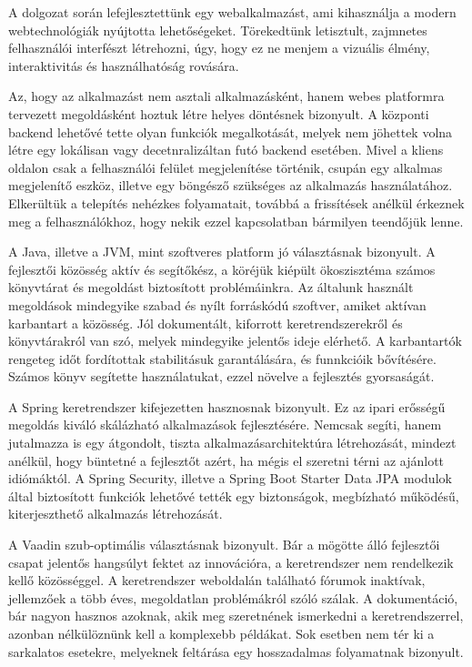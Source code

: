 A dolgozat során lefejlesztettünk egy webalkalmazást, ami kihasználja a modern webtechnológiák nyújtotta lehetőségeket. Törekedtünk letisztult, zajmnetes felhasználói interfészt létrehozni, úgy, hogy ez ne menjem a vizuális élmény, interaktivitás és használhatóság rovására. \par

Az, hogy az alkalmazást nem asztali alkalmazásként, hanem webes platformra tervezett megoldásként hoztuk létre helyes döntésnek bizonyult. A központi backend lehetővé tette olyan funkciók megalkotását, melyek nem jöhettek volna létre egy lokálisan vagy decetnralizáltan futó backend esetében. Mivel a kliens oldalon csak a felhasználói felület megjelenítése történik, csupán egy alkalmas megjelenítő eszköz, illetve egy böngésző szükséges az alkalmazás használatához. Elkerültük a telepítés nehézkes folyamatait, továbbá a frissítések anélkül érkeznek meg a felhasználókhoz, hogy nekik ezzel kapcsolatban bármilyen teendőjük lenne. \par

A Java, illetve a JVM, mint szoftveres platform jó választásnak bizonyult. A fejlesztői közösség aktív és segítőkész, a köréjük kiépült ökoszisztéma számos könyvtárat és megoldást biztosított problémáinkra. Az általunk használt megoldások mindegyike szabad és nyílt forráskódú szoftver, amiket aktívan karbantart a közösség. Jól dokumentált, kiforrott keretrendszerekről és könyvtárakról van szó, melyek mindegyike jelentős ideje elérhető. A karbantartók rengeteg időt fordítottak stabilitásuk garantálására, és funnkcióik bővítésére. Számos könyv segítette használatukat, ezzel növelve a fejlesztés gyorsaságát. \par

A Spring keretrendszer kifejezetten hasznosnak bizonyult. Ez az ipari erősségű megoldás kiváló skálázható alkalmazások fejlesztésére. Nemcsak segíti, hanem jutalmazza is egy átgondolt, tiszta alkalmazásarchitektúra létrehozását, mindezt anélkül, hogy büntetné a fejlesztőt azért, ha mégis el szeretni térni az ajánlott idiómáktól. A Spring Security, illetve a Spring Boot Starter Data JPA modulok által biztosított funkciók lehetővé tették egy biztonságok, megbízható működésű, kiterjeszthető alkalmazás létrehozását. \par

A Vaadin szub-optimális választásnak bizonyult. Bár a mögötte álló fejlesztői csapat jelentős hangsúlyt fektet az innovációra, a keretrendszer nem rendelkezik kellő közösséggel. A keretrendszer weboldalán található fórumok inaktívak, jellemzőek a több éves, megoldatlan problémákról szóló szálak. A dokumentáció, bár nagyon hasznos azoknak, akik meg szeretnének ismerkedni a keretrendszerrel, azonban nélkülöznünk kell a komplexebb példákat. Sok esetben nem tér ki a sarkalatos esetekre, melyeknek feltárása egy hosszadalmas folyamatnak bizonyult. \par

